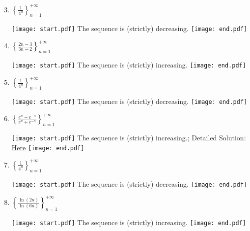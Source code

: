 \documentclass[12pt]{article}
\begin{document}

\begin{enumerate}
\setcounter{enumi}{2}

\item $\left\{ \frac{1}{4^n} \right\}_{n = 1}^{+\infty}$

\texttt{[image: start.pdf]}
{{The sequence is (strictly) decreasing.}}
\texttt{[image: end.pdf]}


\item $\left\{ \frac{2n-3}{3n-2} \right\}_{n = 1}^{+\infty}$

\texttt{[image: start.pdf]}
{{The sequence is (strictly) increasing.}}
\texttt{[image: end.pdf]}


\end{enumerate}


\begin{enumerate}
\setcounter{enumi}{4}

\item $\left\{ \frac{1}{4^n} \right\}_{n = 1}^{+\infty}$

\texttt{[image: start.pdf]}
{{The sequence is (strictly) decreasing.}}
\texttt{[image: end.pdf]}


\item $\left\{ \frac{e^n-e^{-n}}{e^n+e^{-n}} \right\}_{n = 1}^{+\infty}$

\texttt{[image: start.pdf]}
{{The sequence is (strictly) increasing.; Detailed Solution: \textcolor{blue}{\href{http://www.math.drexel.edu/classes/Calculus/resources/Math123HW/Solutions/123_06_Monotone_Sequences_06.pdf}{Here}}}}
\texttt{[image: end.pdf]}



\end{enumerate}


\begin{enumerate}
\setcounter{enumi}{6}

\item $\left\{ \frac{1}{4^n} \right\}_{n = 1}^{+\infty}$

\texttt{[image: start.pdf]}
{{The sequence is (strictly) decreasing.}}
\texttt{[image: end.pdf]}


\item $\left\{ \frac{\ln(2n)}{\ln(6n)} \right\}_{n = 1}^{+\infty}$

\texttt{[image: start.pdf]}
{{The sequence is (strictly) increasing.}}
\texttt{[image: end.pdf]}


\end{enumerate}
\end{document}
